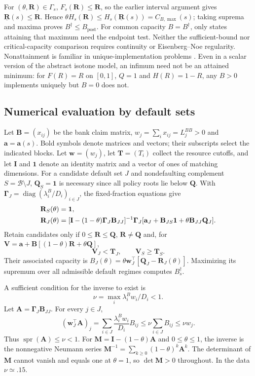 For $(\theta,\mathbf{R})\in\Gamma_s$, $F_s(\mathbf{R})\leq\mathbf{R}$, so the earlier interval argument gives $\underline{\mathbf{R}}(s)\leq\mathbf{R}$. Hence $\theta H_s(\mathbf{R})\leq H_s(\underline{\mathbf{R}}(s))=C_{B,\max}(s)$; taking suprema and maxima proves $B^\dagger\leq B_{\mathrm{post}}$. For common capacity $B=B^\dagger$, only states attaining that maximum need the endpoint test. Neither the sufficient-bound nor critical-capacity comparison requires continuity or Eisenberg--Noe regularity. Nonattainment is familiar in unique-implementation problems \citep{Segal2003}. Even in a scalar version of the abstract isotone model, an infimum need not be an attained minimum: for $F(R)=R$ on $[0,1]$, $Q=1$ and $H(R)=1-R$, any $B>0$ implements uniquely but $B=0$ does not.

\subsection{Numerical evaluation by default sets}
Let $\mathbf{B}=(x_{ij})$ be the bank claim matrix, $w_j=\sum_i x_{ij}=L_j^{BB}>0$ and $\mathbf{a}=\mathbf{a}(s)$. Bold symbols denote matrices and vectors; their subscripts select the indicated blocks. Let $\mathbf{w}=(w_j)$, let $\mathbf{T}=(T_i)$ collect the resource cutoffs, and let $\mathbf{I}$ and $\mathbf1$ denote an identity matrix and a vector of ones of matching dimensions. For a candidate default set $J$ and nondefaulting complement $S=\mathcal B\setminus J$, $\mathbf{Q}_S=\mathbf1$ is necessary since all policy roots lie below $\mathbf{Q}$. With $\boldsymbol{\Gamma}_J=\operatorname{diag}(\lambda_i^B/D_i)_{i\in J}$, the fixed-fraction equations give
\begin{align}
 \mathbf{R}_S(\theta)&=\mathbf1,\notag\\
 \mathbf{R}_J(\theta)&=[\mathbf{I}-(1-\theta)\boldsymbol{\Gamma}_J\mathbf{B}_{JJ}]^{-1}
 \boldsymbol{\Gamma}_J[\mathbf{a}_J+\mathbf{B}_{JS}\mathbf1+\theta \mathbf{B}_{JJ}\mathbf{Q}_J].
 \label{eq:minimum-budget-regime}
\end{align}
Retain candidates only if $0\leq \mathbf{R}\leq \mathbf{Q}$, $\mathbf{R}\ne \mathbf{Q}$ and, for $\mathbf{V}=\mathbf{a}+\mathbf{B}[(1-\theta)\mathbf{R}+\theta \mathbf{Q}]$,
\[
 \mathbf{V}_J<\mathbf{T}_J,\qquad \mathbf{V}_S\geq \mathbf{T}_S.
\]
Their associated capacity is $B_J(\theta)=\theta \mathbf{w}_J^\top[\mathbf{Q}_J-\mathbf{R}_J(\theta)]$. Maximizing its supremum over all admissible default regimes computes $B_s^\dagger$.

A sufficient condition for the inverse to exist is
\[
 \nu=\max_i\lambda_i^B w_i/D_i<1.
\]
Let $\mathbf{A}=\boldsymbol{\Gamma}_J\mathbf{B}_{JJ}$. For every $j\in J$,
\[
 (\mathbf{w}_J^\top\mathbf{A})_j
 =\sum_{i\in J}\frac{\lambda_i^Bw_i}{D_i}B_{ij}
 \leq\nu\sum_{i\in J}B_{ij}\leq\nu w_j.
\]
Thus $\operatorname{spr}(\mathbf{A})\leq\nu<1$. For $\mathbf{M}=\mathbf{I}-(1-\theta)\mathbf{A}$ and $0\leq\theta\leq1$, the inverse is the nonnegative Neumann series $\mathbf{M}^{-1}=\sum_{k\geq0}(1-\theta)^k\mathbf{A}^k$. The determinant of $\mathbf{M}$ cannot vanish and equals one at $\theta=1$, so $\det\mathbf{M}>0$ throughout. In the data $\nu\simeq.15$.

